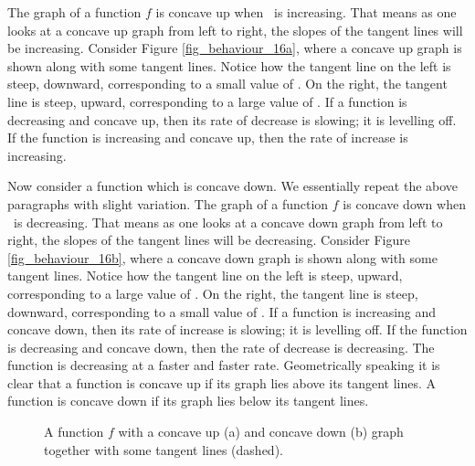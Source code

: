 The graph of a function $f$ is concave up when \fp\ is increasing. That means as one looks at a concave up graph from left to right, the slopes of the tangent lines will be increasing. Consider Figure \ref{fig_behaviour_16a}, where a concave up graph is shown along with some tangent lines. Notice how the tangent line on the left is  steep, downward, corresponding to a  small value of \fp. On the right, the tangent line is steep, upward, corresponding to a large value of \fp. If a function is decreasing and concave up, then its rate of decrease is slowing; it is levelling off.  If the  function is increasing and concave up, then the rate of increase is increasing. 

Now consider a function which is concave down. We essentially repeat the above paragraphs with slight variation. The graph of a function $f$ is concave down  when \fp\ is decreasing. That means as one looks at a concave down graph from left to right, the slopes of the tangent lines will be decreasing. Consider Figure \ref{fig_behaviour_16b}, where a concave down graph is shown along with some tangent lines. Notice how the tangent line on the left is  steep, upward, corresponding to a large value of \fp. On the right, the tangent line is steep, downward, corresponding to a small value of \fp. If a function is increasing and concave down, then its rate of increase is slowing; it is levelling off.  If the function is decreasing and concave down, then the {rate} of decrease is decreasing.  The function is decreasing at a faster and faster rate. Geometrically speaking it is clear that a function is concave up if its graph lies above its tangent lines. A function is concave down if its graph lies below its tangent lines.

\begin{figure}[H]
\centering
\qquad
{}
\caption{A function $f$ with a concave up (a) and concave down (b) graph together with some tangent lines (dashed). }
\end{figure}


